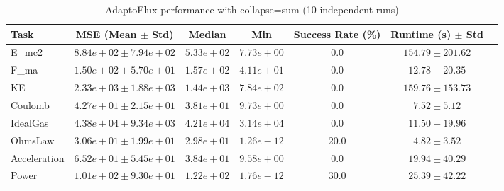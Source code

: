 \begin{table}[h]
\centering
\caption{AdaptoFlux performance with collapse=sum (10 independent runs)}
\label{tab:atf_full_stats_sum}
\begin{tabular}{lcccccc}
\toprule
Task & MSE (Mean $\pm$ Std) & Median & Min & Success Rate (\%) & Runtime (s) $\pm$ Std \\
\midrule
E_mc2 & $8.84e+02 \pm 7.94e+02$ & $5.33e+02$ & $7.73e+00$ & 0.0 & $154.79 \pm 201.62$ \\
F_ma & $1.50e+02 \pm 5.70e+01$ & $1.57e+02$ & $4.11e+01$ & 0.0 & $12.78 \pm 20.35$ \\
KE & $2.33e+03 \pm 1.88e+03$ & $1.44e+03$ & $7.84e+02$ & 0.0 & $159.76 \pm 153.73$ \\
Coulomb & $4.27e+01 \pm 2.15e+01$ & $3.81e+01$ & $9.73e+00$ & 0.0 & $7.52 \pm 5.12$ \\
IdealGas & $4.38e+04 \pm 9.34e+03$ & $4.21e+04$ & $3.14e+04$ & 0.0 & $11.50 \pm 19.96$ \\
OhmsLaw & $3.06e+01 \pm 1.99e+01$ & $2.98e+01$ & $1.26e-12$ & 20.0 & $4.82 \pm 3.52$ \\
Acceleration & $6.52e+01 \pm 5.45e+01$ & $3.84e+01$ & $9.58e+00$ & 0.0 & $19.94 \pm 40.29$ \\
Power & $1.01e+02 \pm 9.30e+01$ & $1.22e+02$ & $1.76e-12$ & 30.0 & $25.39 \pm 42.22$ \\
\bottomrule
\end{tabular}
\end{table}